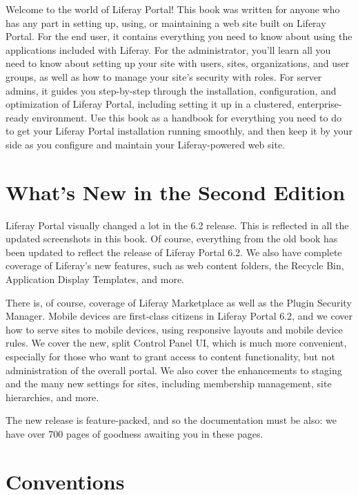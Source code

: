 \documentclass[9pt,openright,twoside]{memoir}
\begin{document}
Welcome to the world of Liferay Portal! This book was written for anyone who has
any part in setting up, using, or maintaining a web site built on Liferay
Portal. For the end user, it contains everything you need to know about using
the applications included with Liferay. For the administrator, you'll learn all
you need to know about setting up your site with users, sites, organizations,
and user groups, as well as how to manage your site's security with roles. For
server admins, it guides you step-by-step through the installation,
configuration, and optimization of Liferay Portal, including setting it up in a
clustered, enterprise-ready environment. Use this book as a handbook for
everything you need to do to get your Liferay Portal installation running
smoothly, and then keep it by your side as you configure and maintain your
Liferay-powered web site.

\section{What's New in the Second Edition}

Liferay Portal visually changed a lot in the 6.2 release. This is reflected in 
all the updated screenshots in this book. Of course, everything from the old
book has been updated to reflect the release of Liferay Portal 6.2. We also
have complete coverage of Liferay's new features, such as web content folders, 
the Recycle Bin, Application Display Templates, and more. 

There is, of course, coverage of Liferay Marketplace as well as the Plugin
Security Manager. Mobile devices are first-class citizens in Liferay Portal 6.2, 
and we cover how to serve sites to mobile devices, using responsive layouts 
and mobile device rules. We cover the new, split Control Panel UI, which is 
much more convenient, especially for those who want to grant access to content 
functionality, but not administration of the overall portal. We also cover the 
enhancements to staging and the many new settings for sites, including 
membership management, site hierarchies, and more. 

The new release is feature-packed, and so the documentation must be also: we
have over 700 pages of goodness awaiting you in these pages. 

\section{Conventions}
\end{document}

